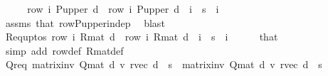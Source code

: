 \begin{isabellebody}
%
\isadelimproof
%
\endisadelimproof
%
\isatagproof
{}\isamarkupfalse%
\ {\isacharminus}{\kern0pt}\isanewline
\ \ \isamarkupfalse%
\ {\isachardoublequoteopen}row\ i\ {\isacharparenleft}{\kern0pt}P{\isacharunderscore}{\kern0pt}upper\ d{\isacharparenright}{\kern0pt}\ {\isacharequal}{\kern0pt}\ row\ i\ {\isacharparenleft}{\kern0pt}P{\isacharunderscore}{\kern0pt}upper\ d{\isacharprime}{\kern0pt}{\isacharparenright}{\kern0pt}{\isachardoublequoteclose}\ \ {\isachardoublequoteopen}i\ {\isasymle}\ s{\isachardoublequoteclose}\ \ i\isanewline
\ \ \ \ \isamarkupfalse%
\ assms\ that\ row{\isacharunderscore}{\kern0pt}P{\isacharunderscore}{\kern0pt}upper{\isacharunderscore}{\kern0pt}indep\ \isamarkupfalse%
\ blast\isanewline
\ \ \isamarkupfalse%
\ R{\isacharunderscore}{\kern0pt}eq{\isacharunderscore}{\kern0pt}upto{\isacharunderscore}{\kern0pt}s{\isacharcolon}{\kern0pt}\ {\isachardoublequoteopen}row\ i\ {\isacharparenleft}{\kern0pt}R{\isacharunderscore}{\kern0pt}mat\ d{\isacharparenright}{\kern0pt}\ {\isacharequal}{\kern0pt}\ row\ i\ {\isacharparenleft}{\kern0pt}R{\isacharunderscore}{\kern0pt}mat\ d{\isacharprime}{\kern0pt}{\isacharparenright}{\kern0pt}{\isachardoublequoteclose}\ \ {\isachardoublequoteopen}i\ {\isasymle}\ s{\isachardoublequoteclose}\ \ i\isanewline
\ \ \ \ \isamarkupfalse%
\ that\isanewline
\ \ \ \ \isamarkupfalse%
\ {\isacharparenleft}{\kern0pt}simp\ add{\isacharcolon}{\kern0pt}\ row{\isacharunderscore}{\kern0pt}def\ R{\isacharunderscore}{\kern0pt}mat{\isacharunderscore}{\kern0pt}def{\isacharparenright}{\kern0pt}\isanewline
\isanewline
\ \ \isamarkupfalse%
\ Qr{\isacharunderscore}{\kern0pt}eq{\isacharcolon}{\kern0pt}\ {\isachardoublequoteopen}{\isacharparenleft}{\kern0pt}matrix{\isacharunderscore}{\kern0pt}inv\ {\isacharparenleft}{\kern0pt}Q{\isacharunderscore}{\kern0pt}mat\ d{\isacharparenright}{\kern0pt}\ {\isacharasterisk}{\kern0pt}v\ r{\isacharunderscore}{\kern0pt}vec\ d{\isacharparenright}{\kern0pt}\ {\isachardollar}{\kern0pt}\ s\ {\isacharequal}{\kern0pt}\ {\isacharparenleft}{\kern0pt}matrix{\isacharunderscore}{\kern0pt}inv\ {\isacharparenleft}{\kern0pt}Q{\isacharunderscore}{\kern0pt}mat\ d{\isacharprime}{\kern0pt}{\isacharparenright}{\kern0pt}\ {\isacharasterisk}{\kern0pt}v\ r{\isacharunderscore}{\kern0pt}vec\ d{\isacharprime}{\kern0pt}{\isacharparenright}{\kern0pt}\ {\isachardollar}{\kern0pt}\ s{\isachardoublequoteclose}\isanewline
\ \ \isamarkupfalse%

\end{isabellebody}
